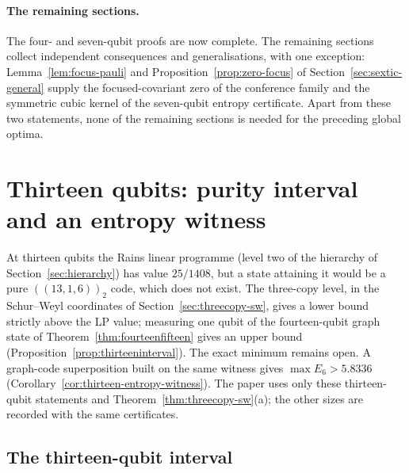 \paragraph{The remaining sections.} The four- and seven-qubit proofs are now complete. The remaining sections collect
independent consequences and generalisations, with one exception: Lemma~\ref{lem:focus-pauli} and
Proposition~\ref{prop:zero-focus} of Section~\ref{sec:sextic-general} supply the focused-covariant zero of the
conference family and the symmetric cubic kernel of the seven-qubit entropy certificate. Apart from these two
statements, none of the remaining sections is needed for the preceding global optima.






\section{Thirteen qubits: purity interval and an entropy witness}\label{sec:sup-thirteen}
At thirteen qubits the Rains linear programme (level two of the hierarchy of Section~\ref{sec:hierarchy}) has value
$25/1408$, but a state attaining it would be a pure $((13,1,6))_2$ code, which does not exist. The three-copy level, in the
Schur--Weyl coordinates of Section~\ref{sec:threecopy-sw}, gives a lower bound strictly above the LP value; measuring one
qubit of the fourteen-qubit graph state of Theorem~\ref{thm:fourteenfifteen} gives an upper bound
(Proposition~\ref{prop:thirteeninterval}). The exact minimum remains open. A graph-code superposition built on the same
witness gives $\max E_6>5.8336$ (Corollary~\ref{cor:thirteen-entropy-witness}). The paper uses only these
thirteen-qubit statements and Theorem~\ref{thm:threecopy-sw}(a); the other sizes are recorded with the same certificates.


\subsection{The thirteen-qubit interval}\label{sec:sup-thirteen-interval}


{\sloppy %
\par}


